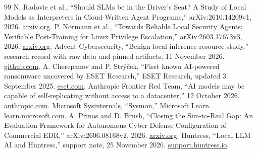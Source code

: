 \documentclass[11pt,letterpaper]{article}
\begin{document}
\begin{thebibliography}{99}
 N. Radovic et al., ``Should SLMs be in the Driver's Seat? A Study of Local Models as Interpreters in Cloud-Written Agent Programs,'' arXiv:2610.14209v1, 2026. \href{https://arxiv.org/html/2610.14209v1}{arxiv.org}.
 P. Normann et al., ``Towards Reliable Local Security Agents: Verifiable Post-Training for Linux Privilege Escalation,'' arXiv:2603.17673v3, 2026. \href{https://arxiv.org/html/2603.17673v3}{arxiv.org}.
 Advent Cybersecurity, ``Benign local inference resource study,'' research record with raw data and pinned artifacts, 11 November 2026. \href{https://github.com/Advent-Cybersecurity/advent-drexel/blob/main/docs/inference-resource-study-2026-11-11.md}{github.com}.
 A. Cherepanov and P. Str\'y\v{c}ek, ``First known AI-powered ransomware uncovered by ESET Research,'' ESET Research, updated 3 September 2025. \href{https://www.eset.com/blog/en/research/first-known-ai-powered-ransomware-uncovered-eset-research/}{eset.com}.
 Anthropic Frontier Red Team, ``AI models may be capable of self-replicating without access to a datacenter,'' 12 October 2026. \href{https://www.anthropic.com/research/self-replicating-ai}{anthropic.com}.
 Microsoft Sysinternals, ``Sysmon,'' Microsoft Learn. \href{https://learn.microsoft.com/en-us/sysinternals/downloads/sysmon}{learn.microsoft.com}.
 A. Prinos and D. Brush, ``Closing the Sim-to-Real Gap: An Evaluation Framework for Autonomous Cyber Defense Configuration of Commercial EDR,'' arXiv:2606.08168v2, 2026. \href{https://arxiv.org/html/2606.08168v2}{arxiv.org}.
 Huntress, ``Local LLM AI and Huntress,'' support note, 25 November 2026. \href{https://support.huntress.io/hc/en-us/articles/57931855382291-Local-LLM-AI-and-Huntress}{support.huntress.io}.
\end{thebibliography}
\endgroup
\end{document}
